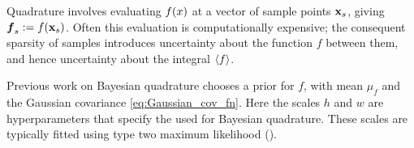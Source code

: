 \documentclass[twoside]{article}
\begin{document}
Quadrature involves evaluating $f(x)$ at a vector of sample points ${\bf x}_s$, giving $\vf\pha_s\deq f(\vlfv_s)$. Often this evaluation is computationally expensive; the consequent sparsity of samples introduces uncertainty about the function $f$ between them, and hence uncertainty about the integral $\langle f \rangle$.



Previous work on Bayesian quadrature chooses a \gpb prior for $f$, with mean $\mu_f$ and the Gaussian covariance \eqref{eq:Gaussian_cov_fn}. Here the scales $h$ and $w$ are hyperparameters that specify the  \gpb used for Bayesian quadrature. These scales are typically fitted using type two maximum likelihood ().

\end{document}
